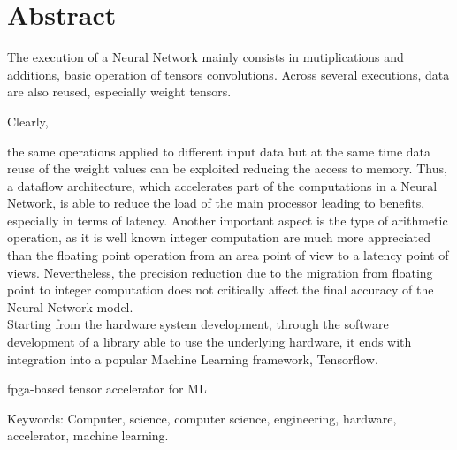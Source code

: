 
\thispagestyle{plain_cover}			%
\setlength{\parskip}{0pt plus 1.0pt}
\section*{Abstract}
The execution of a Neural Network mainly consists in mutiplications and additions, basic operation of tensors convolutions. Across several executions, data are also reused, especially weight tensors.

Clearly, 


the same operations applied to different input data but at the same time data reuse of the weight values can be exploited reducing the access to memory. Thus, a dataflow architecture, which accelerates part of the computations in a Neural Network, is able to reduce the load of the main processor leading to benefits, especially in terms of latency.
Another important aspect is the type of arithmetic operation, as it is well known integer computation are much more appreciated than the floating point operation from an area point of view to a latency point of views. Nevertheless, the precision reduction due to the migration from floating point to integer computation does not critically affect the final accuracy of the Neural Network model.\\


Starting from the hardware system development, through the software development of a library able to use the underlying hardware, it ends with integration into a popular Machine Learning framework, Tensorflow.



fpga-based tensor accelerator for ML



\vfill
Keywords: Computer, science, computer science, engineering, hardware, accelerator, machine learning.

\newpage				%
\thispagestyle{empty}
\mbox{}